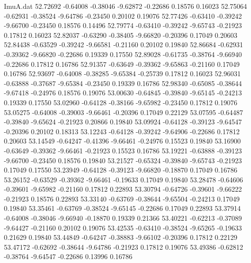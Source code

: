 \begin{filecontents}{ImuA.dat}
  52.72692   -0.64008   -0.38046   -9.62872   -0.22686    0.18576    0.16023
  52.75064   -0.62931   -0.38524   -9.64786   -0.23450    0.20102    0.19076
  52.77426   -0.63410   -0.39242   -9.66700   -0.23450    0.18576    0.14496
  52.79774   -0.63410   -0.39242   -9.65743   -0.21923    0.17812    0.16023
  52.82037   -0.63290   -0.38405   -9.66820   -0.20396    0.17049    0.20603
  52.84438   -0.63529   -0.39242   -9.66581   -0.21160    0.20102    0.19840
  52.86684   -0.62931   -0.39362   -9.66820   -0.22686    0.19339    0.17550
  52.89028   -0.61735   -0.38764   -9.66940   -0.22686    0.17812    0.16786
  52.91357   -0.63649   -0.39362   -9.65863   -0.21160    0.17049    0.16786
  52.93697   -0.64008   -0.38285   -9.65384   -0.25739    0.17812    0.16023
  52.96031   -0.63888   -0.37687   -9.65384   -0.23450    0.19339    0.16786
  52.98340   -0.65085   -0.38644   -9.67418   -0.24976    0.18576    0.19076
  53.00630   -0.64845   -0.39840   -9.65145   -0.24213    0.19339    0.17550
  53.02960   -0.64128   -0.38166   -9.65982   -0.23450    0.17812    0.19076
  53.05275   -0.64008   -0.39003   -9.66461   -0.20396    0.17049    0.22129
  53.07595   -0.64487   -0.39840   -9.65624   -0.21923    0.20866    0.19840
  53.09924   -0.64128   -0.39123   -9.64547   -0.20396    0.20102    0.18313
  53.12243   -0.64128   -0.39242   -9.64906   -0.22686    0.17812    0.20603
  53.14549   -0.64247   -0.41396   -9.66461   -0.24976    0.15523    0.19840
  53.16900   -0.63649   -0.39362   -9.66461   -0.21923    0.15523    0.16786
  53.19221   -0.63888   -0.39123   -9.66700   -0.23450    0.18576    0.19840
  53.21527   -0.65324   -0.39840   -9.65743   -0.21923    0.17049    0.17550
  53.23949   -0.64128   -0.39123   -9.66820   -0.18870    0.17049    0.16786
  53.26152   -0.63529   -0.39362   -9.66461   -0.19633    0.17049    0.19840
  53.28478   -0.64606   -0.39601   -9.65982   -0.21160    0.17812    0.22893
  53.30794   -0.64726   -0.39601   -9.66222   -0.21923    0.18576    0.22893
  53.33140   -0.63769   -0.38644   -9.65504   -0.24213    0.17049    0.19840
  53.35461   -0.63769   -0.38524   -9.65145   -0.22686    0.17049    0.22893
  53.37914   -0.64008   -0.38046   -9.66940   -0.18870    0.19339    0.21366
  53.40221   -0.62213   -0.37089   -9.64427   -0.21160    0.20102    0.19076
  53.42535   -0.63410   -0.38524   -9.65265   -0.19633    0.21629    0.19840
  53.44849   -0.64247   -0.38883   -9.66102   -0.20396    0.17812    0.22129
  53.47172   -0.62692   -0.38644   -9.64786   -0.21923    0.17812    0.19076
  53.49386   -0.62812   -0.38764   -9.64547   -0.22686    0.13996    0.16786

\end{filecontents}
